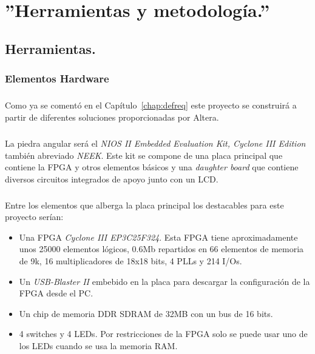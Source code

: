 \documentclass[a4paper,12pt,titlepage,final]{book}
\begin{document}
\chapter{''Herramientas y metodología.''}

\section{Herramientas.}
\subsection{Elementos Hardware}
\subsubsection*{}

\paragraph{}
Como ya se comentó en el Capítulo~\ref{chap:defreq} este proyecto se construirá a partir de diferentes soluciones proporcionadas por Altera.

\paragraph{}
La piedra angular será el \textit{NIOS II Embedded Evaluation Kit, Cyclone III Edition} también abreviado \textit{NEEK}.
Este kit se compone de una placa principal que contiene la FPGA y otros
elementos básicos y una \textit{daughter board} que contiene diversos circuitos integrados
de apoyo junto con un LCD.

\paragraph{}
Entre los elementos que alberga la placa principal los destacables para este
proyecto serían:

\begin{itemize}
\item Una FPGA \textit{Cyclone III EP3C25F324}. Esta FPGA tiene aproximadamente unos 25000 elementos lógicos, 0.6Mb repartidos en 66 elementos de memoria de 9k, 16 multiplicadores de 18x18 bits, 4 PLLs y 214 I/Os.

\item Un \textit{USB-Blaster II} embebido en la placa para descargar la configuración de la FPGA desde el PC.

\item Un chip de memoria DDR SDRAM de 32MB con un bus de 16 bits.

\item 4 switches y 4 LEDs. Por restricciones de la FPGA solo se puede usar uno de los LEDs cuando se usa la memoria RAM.
\end{itemize}
\end{document}
